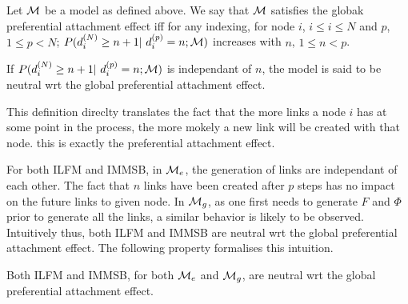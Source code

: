 \begin{definition}
Let $\mathcal{M}$ be a model as defined above. We say that $\mathcal{M}$ satisfies the globak preferential attachment effect iff for any indexing, for node $i$, $i \leq i \leq N$ and $p$, $1 \leq p < N$; 
$P(d_i^{(N)} \geq n+1 | d_i^{(p)} = n; \M)$ increases with $n$, $1 \leq n < p$.

If $P(d_i^{(N)} \geq n+1 | d_i^{(p)} = n; \M)$ is independant of $n$, the model is said to be neutral wrt the global preferential attachment effect.

\end{definition}

This definition direclty translates the fact that the more links a node $i$ has at some point in the process, the more mokely a new link will be created with that node. this is exactly the preferential attachment effect.

For both ILFM and IMMSB, in $\mathcal{M}_e$, the generation of links are independant of each other. The fact that $n$ links have been created after $p$ steps has no impact on the future links to given node. In $\mathcal{M}_g$, as one first needs to generate $F$ and $\Phi$ prior to generate all the links, a similar behavior is likely to be observed. Intuitively thus, both ILFM and IMMSB are neutral wrt the global preferential attachment effect. The following property formalises this intuition.


\begin{proposition} \label{th:mg_glob}
Both ILFM and IMMSB, for both $\mathcal{M}_e$ and $\mathcal{M}_g$, are neutral wrt the global preferential attachment effect.
\end{proposition}

